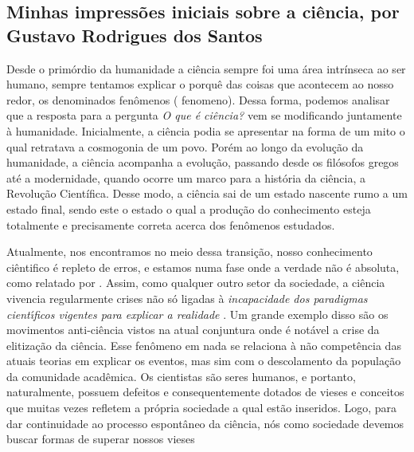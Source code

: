 \subsection{Minhas impressões iniciais sobre a ciência, por Gustavo Rodrigues dos Santos}

Desde o primórdio da humanidade a ciência sempre foi uma área intrínseca ao ser humano, sempre tentamos explicar o porquê das coisas que acontecem ao nosso redor, os denominados fenômenos ( \gls{fenomeno}). Dessa forma, podemos analisar que a resposta para a pergunta \textit{O que é ciência?} vem se modificando juntamente à humanidade. Inicialmente, a ciência podia se apresentar na forma de um mito o qual retratava a cosmogonia de um povo. Porém ao longo da evolução da humanidade, a ciência acompanha a evolução, passando desde os filósofos gregos até a modernidade, quando ocorre um marco para a história da ciência, a Revolução Científica. Desse modo, a ciência sai de um estado nascente rumo a um estado final, sendo este o estado o qual a produção do conhecimento esteja totalmente e precisamente correta acerca dos fenômenos estudados.

Atualmente, nos encontramos no meio dessa transição, nosso conhecimento ciêntifico é repleto de erros, e estamos numa fase onde a verdade não é absoluta, como relatado por \citet{fernandes_consideracoes_2021}. Assim, como qualquer outro setor da sociedade, a ciência vivencia regularmente crises não só ligadas à \textit{incapacidade dos paradigmas cientı́ficos vigentes para explicar a realidade} \citep{fernandes_consideracoes_2021}. Um grande exemplo disso são os movimentos anti-ciência vistos na atual conjuntura onde é notável a crise da elitização da ciência. Esse fenômeno em nada se relaciona à não competência das atuais teorias em explicar os eventos, mas sim com o descolamento da população da comunidade acadêmica. Os cientistas são seres humanos, e portanto, naturalmente, possuem defeitos e consequentemente dotados de vieses e conceitos que muitas vezes refletem a própria sociedade a qual estão inseridos. Logo, para dar continuidade ao processo espontâneo da ciência, nós como sociedade devemos buscar formas de superar nossos vieses 


